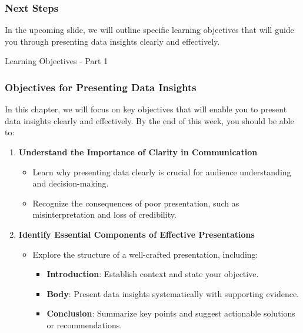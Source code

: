 \documentclass[aspectratio=169]{beamer}
\begin{document}
\begin{frame}[fragile]
    \frametitle{Next Steps}
    In the upcoming slide, we will outline specific learning objectives that will guide you through presenting data insights clearly and effectively.
\end{frame}

\begin{frame}[fragile]{Learning Objectives - Part 1}
  \frametitle{Objectives for Presenting Data Insights}
  In this chapter, we will focus on key objectives that will enable you to present data insights clearly and effectively. By the end of this week, you should be able to:
  \begin{enumerate}
    \item \textbf{Understand the Importance of Clarity in Communication}
    \begin{itemize}
      \item Learn why presenting data clearly is crucial for audience understanding and decision-making.
      \item Recognize the consequences of poor presentation, such as misinterpretation and loss of credibility.
    \end{itemize}
    \item \textbf{Identify Essential Components of Effective Presentations}
    \begin{itemize}
      \item Explore the structure of a well-crafted presentation, including:
      \begin{itemize}
        \item \textbf{Introduction}: Establish context and state your objective.
        \item \textbf{Body}: Present data insights systematically with supporting evidence.
        \item \textbf{Conclusion}: Summarize key points and suggest actionable solutions or recommendations.
      \end{itemize}
    \end{itemize}
  \end{enumerate}
\end{frame}
\end{document}
